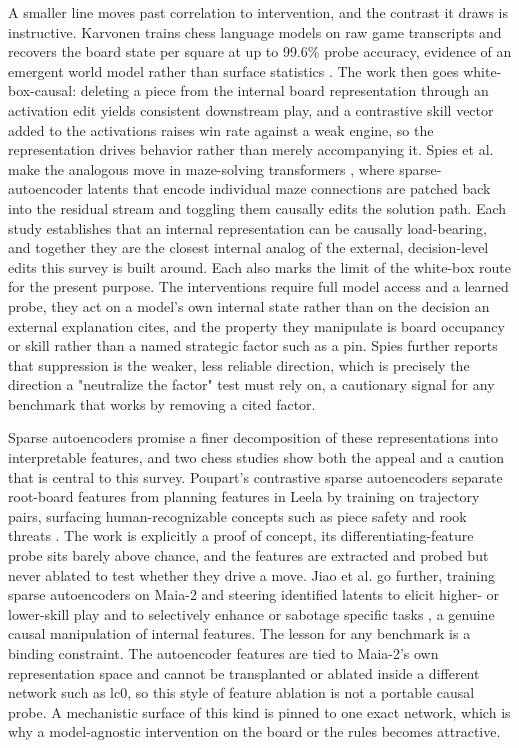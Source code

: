 \documentclass[conference]{IEEEtran}
\begin{document}
A smaller line moves past correlation to intervention, and the contrast it draws is instructive. Karvonen trains chess language models on raw game transcripts and recovers the board state per square at up to 99.6\% probe accuracy, evidence of an emergent world model rather than surface statistics \cite{ref3}. The work then goes white-box-causal: deleting a piece from the internal board representation through an activation edit yields consistent downstream play, and a contrastive skill vector added to the activations raises win rate against a weak engine, so the representation drives behavior rather than merely accompanying it. Spies et al. make the analogous move in maze-solving transformers \cite{ref45}, where sparse-autoencoder latents that encode individual maze connections are patched back into the residual stream and toggling them causally edits the solution path. Each study establishes that an internal representation can be causally load-bearing, and together they are the closest internal analog of the external, decision-level edits this survey is built around. Each also marks the limit of the white-box route for the present purpose. The interventions require full model access and a learned probe, they act on a model's own internal state rather than on the decision an external explanation cites, and the property they manipulate is board occupancy or skill rather than a named strategic factor such as a pin. Spies further reports that suppression is the weaker, less reliable direction, which is precisely the direction a "neutralize the factor" test must rely on, a cautionary signal for any benchmark that works by removing a cited factor.

Sparse autoencoders promise a finer decomposition of these representations into interpretable features, and two chess studies show both the appeal and a caution that is central to this survey. Poupart's contrastive sparse autoencoders separate root-board features from planning features in Leela by training on trajectory pairs, surfacing human-recognizable concepts such as piece safety and rook threats \cite{ref39}. The work is explicitly a proof of concept, its differentiating-feature probe sits barely above chance, and the features are extracted and probed but never ablated to test whether they drive a move. Jiao et al. go further, training sparse autoencoders on Maia-2 and steering identified latents to elicit higher- or lower-skill play and to selectively enhance or sabotage specific tasks \cite{ref53}, a genuine causal manipulation of internal features. The lesson for any benchmark is a binding constraint. The autoencoder features are tied to Maia-2's own representation space and cannot be transplanted or ablated inside a different network such as lc0, so this style of feature ablation is not a portable causal probe. A mechanistic surface of this kind is pinned to one exact network, which is why a model-agnostic intervention on the board or the rules becomes attractive.
\end{document}

